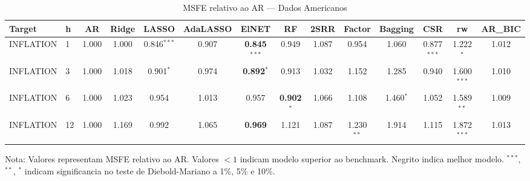 \begin{table}[ht]
\centering
\caption{MSFE relativo ao AR --- Dados Americanos}
\label{tab:msfe_relative}
\begin{tabular}{llcccccccccccc}
\hline\hline
Target & h & AR & Ridge & LASSO & AdaLASSO & ElNET & RF & 2SRR & Factor & Bagging & CSR & rw & AR_BIC \\
\hline
INFLATION & 1 & 1.000 & 1.000 & 0.846$^{***}$ & 0.907 & \textbf{0.845}$^{***}$ & 0.949 & 1.087 & 0.954 & 1.060 & 0.877$^{***}$ & 1.222$^{*}$ & 1.012 \\
INFLATION & 3 & 1.000 & 1.018 & 0.901$^{*}$ & 0.974 & \textbf{0.892}$^{*}$ & 0.913 & 1.032 & 1.152 & 1.285 & 0.940 & 1.600$^{***}$ & 1.010 \\
INFLATION & 6 & 1.000 & 1.023 & 0.954 & 1.013 & 0.957 & \textbf{0.902}$^{*}$ & 1.066 & 1.108 & 1.460$^{*}$ & 1.052 & 1.589$^{**}$ & 1.009 \\
INFLATION & 12 & 1.000 & 1.169 & 0.992 & 1.065 & \textbf{0.969} & 1.121 & 1.087 & 1.230$^{**}$ & 1.914 & 1.115 & 1.872$^{***}$ & 1.013 \\
\hline\hline
\end{tabular}
\begin{tablenotes}
\small
\item Nota: Valores representam MSFE relativo ao AR. Valores $< 1$ indicam modelo superior ao benchmark. Negrito indica melhor modelo. $^{***}$, $^{**}$, $^{*}$ indicam significancia no teste de Diebold-Mariano a 1\%, 5\% e 10\%.
\end{tablenotes}
\end{table}
